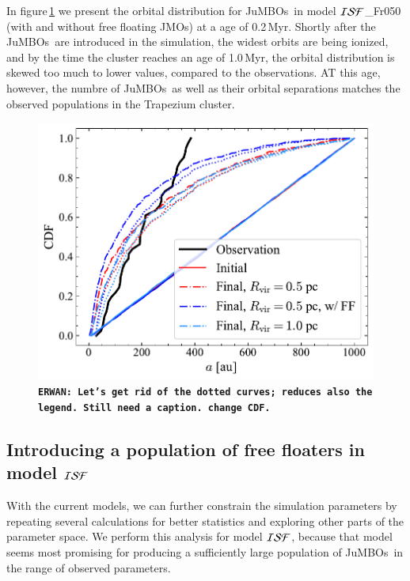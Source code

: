 \documentclass[submission,phys]{lib/SciPost}
\newcommand{\erwan}[1] {{\texttt{\textbf{ERWAN: #1}}} }
\newcommand{\jumbos}{\mbox{JuMBOs}}
\begin{document}
In figure\,\ref{Fig:sma_vs_time_model_ISF_FrA} we present the orbital
distribution for \jumbos\, in model ${\cal ISF}$\_Fr050 (with and
without free floating JMOs) at a age of 0.2\,Myr. Shortly after the
\jumbos\, are introduced in the simulation, the widest orbits are
being ionized, and by the time the cluster reaches an age of 1.0\,Myr,
the orbital distribution is skewed too much to lower values, compared
to the observations. AT this age, however, the numbre of \jumbos\, as
well as their orbital separations matches the observed populations in
the Trapezium cluster. 

\begin{figure}
    \centering
    \includegraphics[width=\columnwidth]{figures/Fractal_General_sem_axis_crop.pdf}
    \caption{
      \erwan{Let's get rid of the dotted curves; reduces also the legend. Still need a caption. change CDF.}  }
        \label{Fig:sma_vs_time_model_ISF_FrA}
\end{figure}


\subsection{Introducing a population of free floaters in model ${\cal ISF}$}\label{sect:ISF_explored}

With the current models, we can further constrain the simulation
parameters by repeating several calculations for better statistics and
exploring other parts of the parameter space.  We perform this
analysis for model ${\cal ISF}$, because that model seems most
promising for producing a sufficiently large population of \jumbos\,
in the range of observed parameters.
\end{document}
